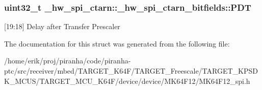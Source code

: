 \subsubsection[{\texorpdfstring{P\+DT}{PDT}}]{\setlength{\rightskip}{0pt plus 5cm}uint32\+\_\+t \+\_\+hw\+\_\+spi\+\_\+ctarn\+::\+\_\+hw\+\_\+spi\+\_\+ctarn\+\_\+bitfields\+::\+P\+DT}\hypertarget{struct__hw__spi__ctarn_1_1__hw__spi__ctarn__bitfields_ae2e2fbf67c6e8ab3acc396d35dfb9ddc}{}\label{struct__hw__spi__ctarn_1_1__hw__spi__ctarn__bitfields_ae2e2fbf67c6e8ab3acc396d35dfb9ddc}
\mbox{[}19\+:18\mbox{]} Delay after Transfer Prescaler 

The documentation for this struct was generated from the following file\+:\begin{DoxyCompactItemize}
\item 
/home/erik/proj/piranha/code/piranha-\/ptc/src/receiver/mbed/\+T\+A\+R\+G\+E\+T\+\_\+\+K64\+F/\+T\+A\+R\+G\+E\+T\+\_\+\+Freescale/\+T\+A\+R\+G\+E\+T\+\_\+\+K\+P\+S\+D\+K\+\_\+\+M\+C\+U\+S/\+T\+A\+R\+G\+E\+T\+\_\+\+M\+C\+U\+\_\+\+K64\+F/device/device/\+M\+K64\+F12/M\+K64\+F12\+\_\+spi.\+h\end{DoxyCompactItemize}
